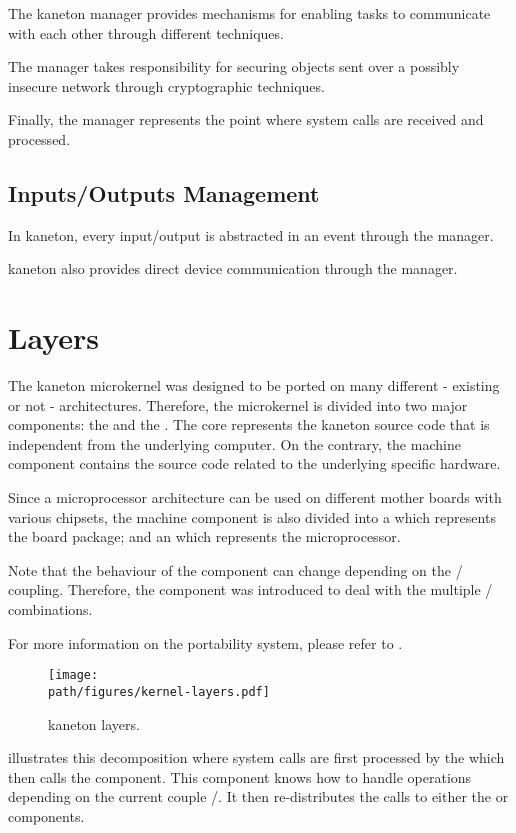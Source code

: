 The kaneton  manager provides mechanisms for enabling tasks
to communicate with each other through different techniques.

The  manager takes responsibility for securing objects
sent over a possibly insecure network through cryptographic techniques.

Finally, the  manager represents the point where system
calls are received and processed.


\subsection*{Inputs/Outputs Management}

In kaneton, every input/output is abstracted in an event through the
 manager.

kaneton also provides direct device communication through the 
manager.

%
%

\section{Layers}

The kaneton microkernel was designed to be ported on many different - existing
or not - architectures. Therefore, the microkernel is divided into two
major components: the  and the . The core
represents the kaneton source code that is independent from the underlying
computer. On the contrary, the machine component contains the source code
related to the underlying specific hardware.

Since a microprocessor architecture can be used on different mother boards
with various chipsets, the machine component is also divided into a
 which represents the board package; and an
 which represents the microprocessor.

Note that the behaviour of the  component can change depending
on the / coupling. Therefore, the
 component was introduced to deal with the multiple
/ combinations.

For more information on the portability system, please refer to
.

\begin{figure}[h]
  \begin{center}
    \texttt{[image: \\path/figures/kernel-layers.pdf]}
    \caption{kaneton layers.}
    \label{figure:kernel-layers}
  \end{center}
\end{figure}

 illustrates this decomposition
where system calls are first processed by the  which then calls the
 component. This component knows how to handle operations depending
on the current couple /. It then
re-distributes the calls to either the  or 
components.
